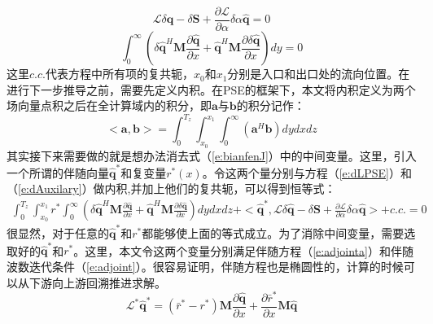 \begin{equation}
\label{e:dLPSE}
\mathscr{L}\delta {\mathbf{\hat q}} - \delta {\mathbf{S}} + \frac{{\partial {\mathscr{L}}}}
{{\partial \alpha }}\delta \alpha {\mathbf{\hat q}} = 0
\end{equation}
\begin{equation}
\label{e:dAuxilary}
\int_0^\infty  {\left( {\delta {\mathbf{\hat q}}^H {\mathbf{M}}\frac{{\partial {\mathbf{\hat q}}}}
{{\partial x}} + {\mathbf{\hat q}}^H {\mathbf{M}}\frac{{\partial \delta {\mathbf{\hat q}}}}
{{\partial x}}} \right)dy}  = 0
\end{equation}
这里$c.c.$代表方程中所有项的复共轭，$x_0$和$x_1$分别是入口和出口处的流向位置。在进行下一步推导之前，需要先定义内积。在PSE的框架下，本文将内积定义为两个场向量点积之后在全计算域内的积分，即$\mathbf a$与$\mathbf b$的积分记作：
\begin{equation}
\label{e:innerproduct}
<\mathbf{a},\mathbf{b}>=\int_{0}^{T_z}\int_{x_0}^{x_1}\int_{0}^\infty (\mathbf{a}^H\mathbf{b})dydxdz
\end{equation}
其实接下来需要做的就是想办法消去式（\ref{e:bianfenJ}）中的中间变量。这里，引入一个所谓的伴随向量${\mathbf{\hat q}}^*$和复变量$r^*(x)$。令这两个量分别与方程（\ref{e:dLPSE}）和（\ref{e:dAuxilary}）做内积,并加上他们的复共轭，可以得到恒等式：
\begin{equation}
\label{e:dadjoint1}
\begin{aligned}
     \int_{0}^{T_z} {\int_{x_0}^{x_1}{r^* \int_0^\infty  {\left( {\delta {\mathbf{\hat q}}^H {\mathbf{M}}\frac{{\partial {\mathbf{\hat q}}}}{{\partial x}} + {\mathbf{\hat q}}^H {\mathbf{M}}\frac{{\partial \delta {\mathbf{\hat q}}}}{{\partial x}}} \right)dydxdz} } }%
     +<{\mathbf{\hat q}}^*,{\mathscr{L}}\delta {\mathbf{\hat q}}-\delta {\mathbf{S}} + \frac{{\partial {\mathscr{L}}}}{{\partial \alpha }}\delta \alpha {\mathbf{\hat q}} > + c.c. = 0
\end{aligned}
\end{equation}
很显然，对于任意的$\mathbf{\hat q}^*$和$r^*$都能够使上面的等式成立。为了消除中间变量，需要选取好的$\mathbf{\hat q}^*$和$r^*$。这里，本文令这两个变量分别满足伴随方程（\ref{e:adjointa}）和伴随波数迭代条件（\ref{e:adjoint}）。很容易证明，伴随方程也是椭圆性的，计算的时候可以从下游向上游回溯推进求解。
\begin{equation}
\label{e:adjoint}
\mathscr{L}^* {\mathbf{\hat q}}^*  = \left( {\bar r^*  - r^* } \right){\mathbf{M}}\frac{{\partial {\mathbf{\hat q}}}}
{{\partial x}} + \frac{{\partial \bar r^* }}
{{\partial x}}{\mathbf{M\hat q}}
\end{equation}
